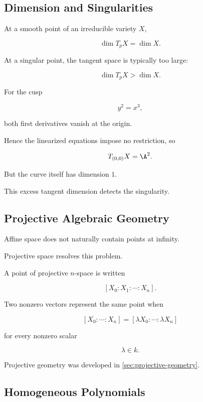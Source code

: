 \subsection{Dimension and Singularities}
\label{subsec:dimension-singularities}

At a smooth point of an irreducible variety \(X\),

\[
\boxed{
\dim T_pX=\dim X.
}
\]

At a singular point, the tangent space is typically too large:

\[
\boxed{
\dim T_pX>\dim X.
}
\]

For the cusp

\[
y^2=x^3,
\]

both first derivatives vanish at the origin.

Hence the linearized equations impose no restriction, so

\[
T_{(0,0)}X=\A^2.
\]

But the curve itself has dimension \(1\).

This excess tangent dimension detects the singularity.

\subsection{Projective Algebraic Geometry}
\label{subsec:projective-algebraic-geometry}

Affine space does not naturally contain points at infinity.

Projective space resolves this problem.

A point of projective \(n\)-space is written

\[
\boxed{
[X_0:X_1:\cdots:X_n].
}
\]

Two nonzero vectors represent the same point when

\[
\boxed{
[X_0:\cdots:X_n]
=
[\lambda X_0:\cdots:\lambda X_n]
}
\]

for every nonzero scalar

\[
\lambda\in k.
\]

Projective geometry was developed in
\cref{sec:projective-geometry}.

\subsection{Homogeneous Polynomials}
\label{subsec:algebraic-homogeneous-polynomials}

